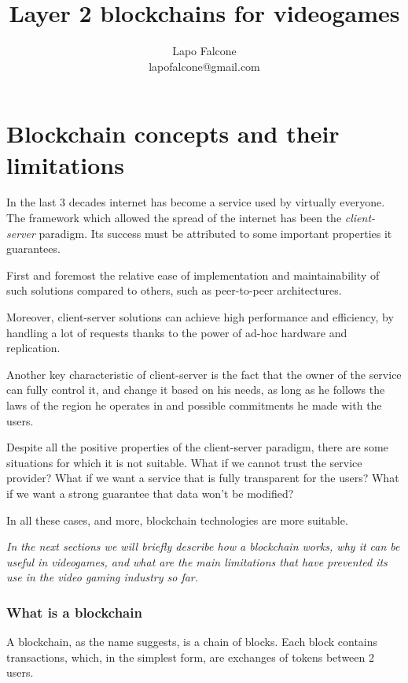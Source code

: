 \documentclass[12pt]{article}
\title{Layer 2 blockchains for videogames}
\author{Lapo Falcone \\ lapofalcone@gmail.com}
\begin{document}
\maketitle
\tableofcontents

\newpage

\part{Blockchain concepts and their limitations} \label{part:bcatl}
In the last 3 decades internet has become a service used by virtually everyone. The framework which allowed the spread of the internet has been the \textit{client-server} paradigm.
Its success must be attributed to some important properties it guarantees. 

First and foremost the relative ease of implementation and maintainability of such solutions compared to others, such as peer-to-peer architectures.

Moreover, client-server solutions can achieve high performance and efficiency, by handling a lot of requests thanks to the power of ad-hoc hardware and replication. 

Another key characteristic of client-server is the fact that the owner of the service can fully control it, and change it based on his needs, as long as he follows the laws of the region he operates in and possible commitments he made with the users.

Despite all the positive properties of the client-server paradigm, there are some situations for which it is not suitable. 
What if we cannot trust the service provider? What if we want a service that is fully transparent for the users? What if we want a strong guarantee that data won't be modified?

In all these cases, and more, blockchain technologies are more suitable.

\emph{In the next sections we will briefly describe how a blockchain works, why it can be useful in videogames, and what are the main limitations that have prevented its use in the video gaming industry so far.}

\section {What is a blockchain} \label{section:wiab}
A blockchain, as the name suggests, is a chain of blocks. Each block contains transactions, which, in the simplest form, are exchanges of tokens between 2 users.
\end{document}
